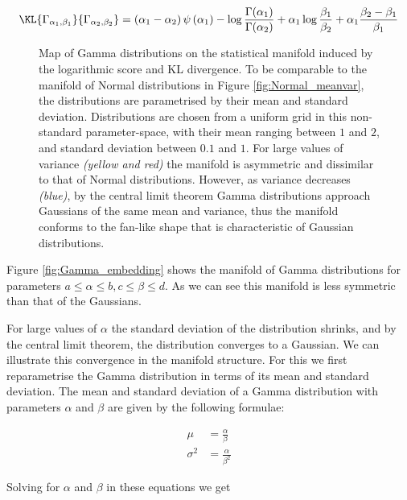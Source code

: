 \begin{equation}
	\KL{\Gamma_{\alpha_1,\beta_1}}{\Gamma_{\alpha_2,\beta_2}} = \left(\alpha_1 - \alpha_2\right)\psi\left(\alpha_1\right) - \log\frac{\Gamma(\alpha_1)}{\Gamma(\alpha_2)} + \alpha_1\log\frac{\beta_1}{\beta_2} + \alpha_1\frac{\beta_2 - \beta_1}{\beta_1} \label{eqn:KL_Gamma}
\end{equation}

\begin{figure} %
	\begin{center}
	\end{center}
	\caption{Map of Gamma distributions on the statistical manifold induced by the logarithmic score and KL divergence. To be comparable to the manifold of Normal distributions in Figure \ref{fig:Normal_meanvar}, the distributions are parametrised by their mean and standard deviation. Distributions are chosen from a uniform grid in this non-standard parameter-space, with their mean ranging between $1$ and $2$, and standard deviation between $0.1$ and $1$. For large values of variance \emph{(yellow and red)} the manifold is asymmetric and dissimilar to that of Normal distributions. However, as variance decreases \emph{(blue)}, by the central limit theorem Gamma distributions approach Gaussians of the same mean and variance, thus the manifold conforms to the fan-like shape that is characteristic of Gaussian distributions.}
\end{figure}

Figure \ref{fig:Gamma_embedding} shows the manifold of Gamma distributions for parameters $a \leq \alpha \leq b, c\leq \beta \leq d$. As we can see this manifold is less symmetric than that of the Gaussians.

For large values of $\alpha$ the standard deviation of the distribution shrinks, and by the central limit theorem, the distribution converges to a Gaussian. We can illustrate this convergence in the manifold structure. For this we first reparametrise the Gamma distribution in terms of its mean and standard deviation. The mean and standard deviation of a Gamma distribution with parameters $\alpha$ and $\beta$ are given by the following formulae:

\begin{align}
	\mu &= \frac{\alpha}{\beta}\\
	\sigma^2 &= \frac{\alpha}{\beta^2}
\end{align}

Solving for $\alpha$ and $\beta$ in these equations we get

